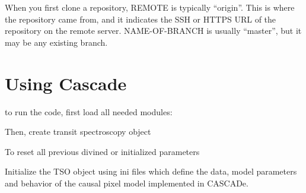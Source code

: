 \documentclass[a4paper,10pt,english]{sphinxmanual}
\begin{document}
When you first clone a repository, REMOTE is typically “origin”. This is where the repository came from, and it indicates the SSH or HTTPS URL of the repository on the remote server. NAME-OF-BRANCH is usually “master”, but it may be any existing branch.


\section{Using Cascade}
\label{\detokenize{howto:using-cascade}}\label{\detokenize{howto::doc}}
to run the code, first load all needed modules:

%
\begin{sphinxVerbatim}[commandchars=\\\{\}]
 
\end{sphinxVerbatim}

Then, create transit spectroscopy object

%
\begin{sphinxVerbatim}[commandchars=\\\{\}]
  
\end{sphinxVerbatim}

To reset all previous divined or initialized parameters

%
\begin{sphinxVerbatim}[commandchars=\\\{\}]
\end{sphinxVerbatim}

Initialize the TSO object using ini files which define the data, model parameters and behavior of the causal pixel model implemented in CASCADe.

%
\begin{sphinxVerbatim}[commandchars=\\\{\}]
  
   
                            
\end{sphinxVerbatim}
\end{document}
